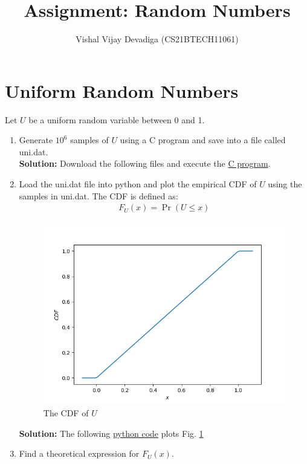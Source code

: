 \documentclass[journal,12pt,twocolumn]{IEEEtran}
\title{Assignment: Random Numbers}
\author{Vishal Vijay Devadiga (CS21BTECH11061)}
\date{}
\numberwithin{equation}{section}
\renewcommand\thesection{\arabic{section}}
\providecommand{\pr}[1]{\ensuremath{\Pr\left(#1\right)}}
\newcommand{\solution}{\noindent \textbf{Solution: }}
\providecommand{\link}[2]{{\color{blue}\href{https://github.com/SterbenVD/AI1110-Assignments/Assignment/#1}{#2}}}
\begin{document}
\maketitle

\section{Uniform Random Numbers}
Let $U$ be a uniform random variable between 0 and 1.
\begin{enumerate}[label=\thesection.\arabic*,ref=\thesection.\theenumi]
\item Generate $10^6$ samples of $U$ using a C program and save into a file called uni.dat.
\\
\solution Download the following files and execute the \link{codes/1-1.c}{C program}.
\\
\item
Load the uni.dat file into python and plot the empirical CDF of $U$ using the samples in uni.dat. 
The CDF is defined as:
\begin{align}
F_{U}(x) = \pr{U \le x}
\end{align}
\begin{figure}[H]
\centering
\includegraphics[width=\columnwidth]{../figs/1_cdf.png}
\caption{The CDF of $U$}
\label{fig:1_cdf}
\end{figure}
\solution  The following \link{codes/1-2.py}{python code} plots Fig. \ref{fig:1_cdf}
\\
\item Find a  theoretical expression for $F_{U}(x)$.
\\

\end{enumerate}
\end{document}
